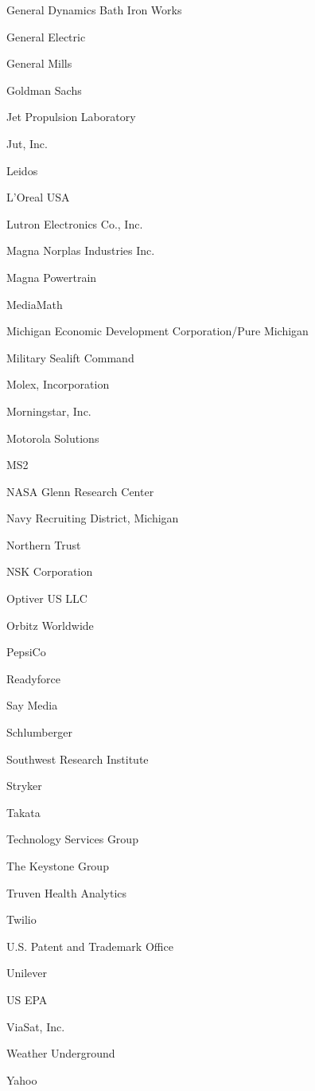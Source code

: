 \documentclass[twoside]{article}
\begin{document}
\begin{center}
\begin{multicols}{5}
\begin{FlushLeft}
\begin{compactitem}
\item General Dynamics Bath Iron Works
\item General Electric
\item General Mills
\item Goldman Sachs
\item Jet Propulsion Laboratory
\item Jut, Inc.
\item Leidos
\item L'Oreal USA
\item Lutron Electronics Co., Inc.
\item Magna Norplas Industries Inc.
\item Magna Powertrain
\item MediaMath
\item Michigan Economic Development Corporation/Pure Michigan
\item Military Sealift Command
\item Molex, Incorporation
\item Morningstar, Inc.
\item Motorola Solutions
\item MS2
\item NASA Glenn Research Center
\item Navy Recruiting District, Michigan
\item Northern Trust
\item NSK Corporation
\item Optiver US LLC
\item Orbitz Worldwide
\item PepsiCo
\item Readyforce
\item Say Media
\item Schlumberger
\item Southwest Research Institute
\item Stryker
\item Takata
\item Technology Services Group
\item The Keystone Group
\item Truven Health Analytics
\item Twilio
\item U.S. Patent and Trademark Office
\item Unilever
\item US EPA
\item ViaSat, Inc.
\item Weather Underground
\item Yahoo

\end{compactitem}
\end{FlushLeft}
\end{multicols}
\end{center}
\end{document}
